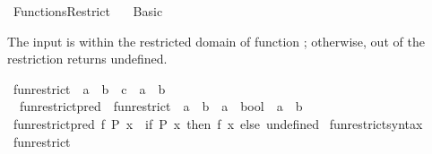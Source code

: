 %
\begin{isabellebody}%
%
%
\isadelimtheory
%
\endisadelimtheory
%
\isatagtheory
\isanewline
{}\isamarkupfalse%
\ Functions{\isacharunderscore}{\kern0pt}Restrict\isanewline
\ \ \ Basic\isanewline
{}%
\endisatagtheory
{\isafoldtheory}%
%
\isadelimtheory
%
\endisadelimtheory
%
\isadelimdocument
%
\endisadelimdocument
%
\isatagdocument
%
\isamarkuptrue%
%
\endisatagdocument
{\isafolddocument}%
%
\isadelimdocument
%
\endisadelimdocument
%
\begin{isamarkuptext}%
The input is within the restricted domain of function ; otherwise, 
out of the restriction returns undefined.%
\end{isamarkuptext}\isamarkuptrue%
\isamarkupfalse%
\ fun{\isacharunderscore}{\kern0pt}restrict\ {\isacharcolon}{\kern0pt}{\isacharcolon}{\kern0pt}\ {\isachardoublequoteopen}{\isacharparenleft}{\kern0pt}{\isacharprime}{\kern0pt}a\ {\isasymRightarrow}\ {\isacharprime}{\kern0pt}b{\isacharparenright}{\kern0pt}\ {\isasymRightarrow}\ {\isacharprime}{\kern0pt}c\ {\isasymRightarrow}\ {\isacharprime}{\kern0pt}a\ {\isasymRightarrow}\ {\isacharprime}{\kern0pt}b{\isachardoublequoteclose}\isanewline
\isanewline
{}\isamarkupfalse%
\isanewline
\ \ fun{\isacharunderscore}{\kern0pt}restrict{\isacharunderscore}{\kern0pt}pred\ {\isasymequiv}\ {\isachardoublequoteopen}fun{\isacharunderscore}{\kern0pt}restrict\ {\isacharcolon}{\kern0pt}{\isacharcolon}{\kern0pt}\ {\isacharparenleft}{\kern0pt}{\isacharprime}{\kern0pt}a\ {\isasymRightarrow}\ {\isacharprime}{\kern0pt}b{\isacharparenright}{\kern0pt}\ {\isasymRightarrow}\ {\isacharparenleft}{\kern0pt}{\isacharprime}{\kern0pt}a\ {\isasymRightarrow}\ bool{\isacharparenright}{\kern0pt}\ {\isasymRightarrow}\ {\isacharprime}{\kern0pt}a\ {\isasymRightarrow}\ {\isacharprime}{\kern0pt}b{\isachardoublequoteclose}\isanewline
{}\isanewline
\ \ \isamarkupfalse%
\ {\isachardoublequoteopen}fun{\isacharunderscore}{\kern0pt}restrict{\isacharunderscore}{\kern0pt}pred\ f\ P\ x\ {\isasymequiv}\ if\ P\ x\ then\ f\ x\ else\ undefined{\isachardoublequoteclose}\isanewline
{}\isamarkupfalse%
\isanewline
\isanewline
{}\isamarkupfalse%
\ fun{\isacharunderscore}{\kern0pt}restrict{\isacharunderscore}{\kern0pt}syntax\isanewline
{}\isanewline
{}\isamarkupfalse%
\ fun{\isacharunderscore}{\kern0pt}restrict\ {\isacharparenleft}{\kern0pt}{\isachardoublequoteopen}{\isacharparenleft}{\kern0pt}{\isacharunderscore}{\kern0pt}{\isacharparenright}{\kern0pt}{\isasymrestriction}{\isacharparenleft}{\kern0pt}\isactrlbsub {\isacharunderscore}{\kern0pt}\isactrlesub {\isacharparenright}{\kern0pt}{\isachardoublequoteclose}\ {\isacharbrackleft}{\kern0pt}{}{}{}{}{\isacharbrackright}{\kern0pt}{\isacharparenright}{\kern0pt}\isanewline

\end{isabellebody}
